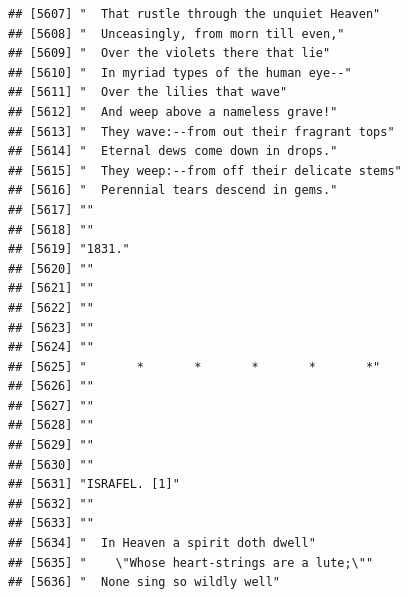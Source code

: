 \documentclass{article}\usepackage[]{graphicx}\usepackage[]{color}
\makeatletter
\newenvironment{kframe}{%
 \def\at@end@of@kframe{}%
 \ifinner\ifhmode%
  \def\at@end@of@kframe{\end{minipage}}%
  \begin{minipage}{\columnwidth}%
 \fi\fi%
 \def\FrameCommand##1{\hskip\@totalleftmargin \hskip-\fboxsep
 \colorbox{shadecolor}{##1}\hskip-\fboxsep
     \hskip-\linewidth \hskip-\@totalleftmargin \hskip\columnwidth}%
 \MakeFramed {\advance\hsize-\width
   \@totalleftmargin\z@ \linewidth\hsize
   \@setminipage}}%
 {\par\unskip\endMakeFramed%
 \at@end@of@kframe}
\newenvironment{knitrout}{}{} %
\makeatother
\begin{document}
\begin{knitrout}
\begin{kframe}
\begin{verbatim}
## [5607] "  That rustle through the unquiet Heaven"                                    
## [5608] "  Unceasingly, from morn till even,"                                         
## [5609] "  Over the violets there that lie"                                           
## [5610] "  In myriad types of the human eye--"                                        
## [5611] "  Over the lilies that wave"                                                 
## [5612] "  And weep above a nameless grave!"                                          
## [5613] "  They wave:--from out their fragrant tops"                                  
## [5614] "  Eternal dews come down in drops."                                          
## [5615] "  They weep:--from off their delicate stems"                                 
## [5616] "  Perennial tears descend in gems."                                          
## [5617] ""                                                                            
## [5618] ""                                                                            
## [5619] "1831."                                                                       
## [5620] ""                                                                            
## [5621] ""                                                                            
## [5622] ""                                                                            
## [5623] ""                                                                            
## [5624] ""                                                                            
## [5625] "       *       *       *       *       *"                                    
## [5626] ""                                                                            
## [5627] ""                                                                            
## [5628] ""                                                                            
## [5629] ""                                                                            
## [5630] ""                                                                            
## [5631] "ISRAFEL. [1]"                                                                
## [5632] ""                                                                            
## [5633] ""                                                                            
## [5634] "  In Heaven a spirit doth dwell"                                             
## [5635] "    \"Whose heart-strings are a lute;\""                                     
## [5636] "  None sing so wildly well"                                                  

\end{verbatim}
\end{kframe}
\end{knitrout}
\end{document}
